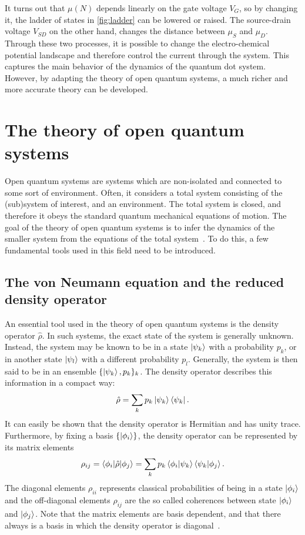 \documentclass[../main.tex]{subfiles}
\begin{document}
It turns out that $\mu(N)$ depends linearly on the gate voltage $V_G$, so by changing it, the ladder of states in \cref{fig:ladder} can be lowered or raised. The source-drain voltage $V_{SD}$ on the other hand, changes the distance between $\mu_S$ and $\mu_D$. Through these two processes, it is possible to change the electro-chemical potential landscape and therefore control the current through the system. This captures the main behavior of the dynamics of the quantum dot system. However, by adapting the theory of open quantum systems, a much richer and more accurate theory can be developed.

\section{The theory of open quantum systems}
Open quantum systems are systems which are non-isolated and connected to some sort of environment. Often, it considers a total system consisting of the (sub)system of interest, and an environment. The total system is closed, and therefore it obeys the standard quantum mechanical equations of motion. The goal of the theory of open quantum systems is to infer the dynamics of the smaller system from the equations of the total system~\cite{lindblad}. To do this, a few fundamental tools used in this field need to be introduced.

\subsection{The von Neumann equation and the reduced density operator}

An essential tool used in the theory of open quantum systems is the density operator $\hat{\rho}$. In such systems, the exact state of the system is generally unknown. Instead, the system may be known to be in a state $\ket{\psi_k}$ with a probability $p_k$, or in another state $\ket{\psi_l}$ with a different probability $p_l$. Generally, the system is then said to be in an ensemble $\{\ket{\psi_k}, p_k\}_k$. The density operator describes this information in a compact way:
\begin{equation}
    \hat{\rho} = \sum_k p_k \ket{\psi_k}\bra{\psi_k}.
\end{equation}
It can easily be shown that the density operator is Hermitian and has unity trace. Furthermore, by fixing a basis $\{\ket{\phi_i}\}$, the density operator can be represented by its matrix elements 
\begin{equation}
    \rho_{ij} = \braket{\phi_i|\hat\rho|\phi_j} = \sum_k p_k \braket{\phi_i|\psi_k}\braket{\psi_k|\phi_j}.
\end{equation}
The diagonal elements $\rho_{ii}$ represents classical probabilities of being in a state $\ket{\phi_i}$ and the off-diagonal elements $\rho_{ij}$ are the so called coherences between state $\ket{\phi_i}$ and $\ket{\phi_j}$. Note that the matrix elements are basis dependent, and that there always is a basis in which the density operator is diagonal~\cite{bookopen}.
\end{document}
